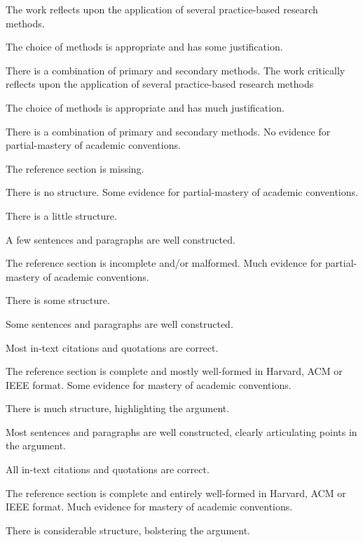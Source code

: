 \documentclass{../../fal_assignment}
\begin{document}
\begin{markingrubric}
        \grade The work reflects upon the application of several practice-based research methods.
            \par The choice of methods is appropriate and has some justification.
            \par There is a combination of primary and secondary methods.
        \grade The work critically reflects upon the application of several practice-based research methods 
            \par The choice of methods is appropriate and has much justification.
            \par There is a combination of primary and secondary methods.
%
        \grade\fail No evidence for partial-mastery of academic conventions.
        \par The reference section is missing.
        \par There is no structure.
        \grade 	Some evidence for partial-mastery of academic conventions.
            \par There is a little structure.
            \par A few sentences and paragraphs are well constructed.
            \par 	The reference section is incomplete and/or malformed.
        \grade Much evidence for partial-mastery of academic conventions.
        \par There is some structure.
            \par Some sentences and paragraphs are well constructed.
        \par Most in-text citations and quotations are correct.
        \par The reference section is complete and mostly well-formed in Harvard, ACM or IEEE format.
        \grade Some evidence for mastery of academic conventions.
            \par There is much structure, highlighting the argument.
            \par Most sentences and paragraphs are well constructed, clearly articulating points in the argument.
        \par All in-text citations and quotations are correct.
        \par The reference section is complete and entirely well-formed in Harvard, ACM or IEEE format.
        \grade 	Much evidence for mastery of academic conventions.
            \par There is considerable structure, bolstering the argument.

\end{markingrubric}
\end{document}
